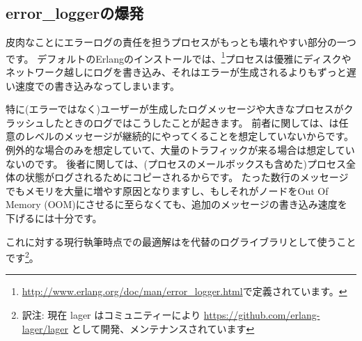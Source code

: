 \subsection{error\_loggerの爆発}

皮肉なことにエラーログの責任を担うプロセスがもっとも壊れやすい部分の一つです。
デフォルトのErlangのインストールでは、\footnote{\href{http://www.erlang.org/doc/man/error\_logger.html}{http://www.erlang.org/doc/man/error\_logger.html}で定義されています。}プロセスは優雅にディスクやネットワーク越しにログを書き込み、それはエラーが生成されるよりもずっと遅い速度での書き込みなってしまいます。

特に(エラーではなく)ユーザーが生成したログメッセージや大きなプロセスがクラッシュしたときのログではこうしたことが起きます。
前者に関しては、は任意のレベルのメッセージが継続的にやってくることを想定していないからです。
例外的な場合のみを想定していて、大量のトラフィックが来る場合は想定していないのです。
後者に関しては、(プロセスのメールボックスも含めた)プロセス全体の状態がログされるためにコピーされるからです。
たった数行のメッセージでもメモリを大量に増やす原因となりますし、もしそれがノードをOut Of Memory (OOM)にさせるに至らなくても、追加のメッセージの書き込み速度を下げるには十分です。

これに対する現行執筆時点での最適解は\href{https://github.com/basho/lager}{}を代替のログライブラリとして使うことです\footnote{訳注: 現在 lager はコミュニティーにより \href{https://github.com/erlang-lager/lager}{https://github.com/erlang-lager/lager} として開発、メンテナンスされています}。

